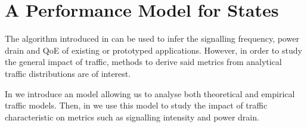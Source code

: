 \section{A Performance Model for   States}\label{sec:network:performance_model}
The algorithm introduced in  can be used to infer the signalling frequency, power drain and \gls{QoE} of existing or prototyped applications.
However, in order to study the general impact of traffic, methods to derive said metrics from analytical traffic distributions are of interest.

In  we introduce an model allowing us to 
analyse both theoretical and empirical traffic models.
Then, in  we use this model to study the impact of traffic characteristic on metrics such as signalling intensity and power drain.



